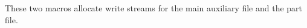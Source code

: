 \begin{comment}

%
%
%
%
%
%
%
\newread\@inputcheck
\newwrite\@unused
%
\end{comment}

 \begin{macro}{\@mainaux}
 \begin{macro}{\@partaux}
  These two macros allocate write streams for the main auxiliary file
  and the part file.
 \end{macro}
 \end{macro}
    \begin{teX}
\newwrite\@mainaux
\newwrite\@partaux
    \end{teX}


